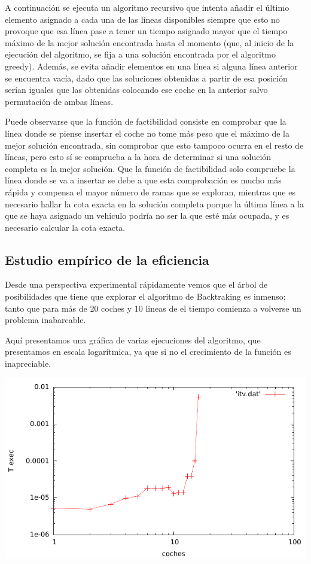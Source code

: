 \documentclass[a4paper, 11pt]{article}
\begin{document}

A continuación se ejecuta un algoritmo recursivo que intenta añadir el último elemento asignado a cada una de las líneas disponibles siempre que esto no provoque que esa línea pase a tener un tiempo asignado mayor que el tiempo máximo de la mejor solución encontrada hasta el momento (que, al inicio de la ejecución del algoritmo, se fija a una solución encontrada por el algoritmo greedy). Además, se evita añadir elementos en una línea si alguna línea anterior se encuentra vacía, dado que las soluciones obtenidas a partir de esa posición serían iguales que las obtenidas colocando ese coche en la anterior salvo permutación de ambas líneas.


Puede observarse que la función de factibilidad consiste en comprobar que la línea donde se piense insertar el coche no tome más peso que el máximo de la mejor solución encontrada, sin comprobar que esto tampoco ocurra en el resto de líneas, pero esto sí se comprueba a la hora de determinar si una solución completa es la mejor solución. Que la función de factibilidad solo compruebe la línea donde se va a insertar se debe a que esta comprobación es mucho más rápida y compensa el mayor número de ramas que se exploran, mientras que es necesario hallar la cota exacta en la solución completa porque la última línea a la que se haya asignado un vehículo podría no ser la que esté más ocupada, y es necesario calcular la cota exacta.

\subsection{Estudio empírico de la eficiencia}

Desde una perspectiva experimental rápidamente vemos que el árbol de posibilidades que tiene que explorar el algoritmo de Backtraking es inmenso; tanto que para más de 20 coches y 10 lineas de el tiempo comienza a volverse un problema inabarcable.

Aquí presentamos una gráfica de varias ejecuciones del algoritmo, que presentamos en escala logarítmica, ya que si no el crecimiento de la función es inapreciable.
\begin{center}
	\includegraphics{./img/itvEficiencia}
\end{center}
\end{document}

